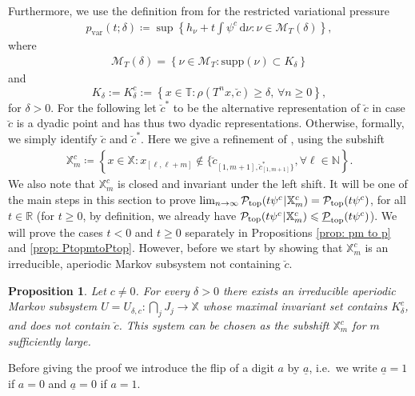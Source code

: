 \documentclass[11pt,reqno]{amsart}
\theoremstyle{plain}
\newtheorem{prop}[theorem]{Proposition}
\theoremstyle{definition}
\newcommand{\X}{{\mathbb X}}
\newcommand{\cP}{\mathcal{P}}
\newcommand{\ts}{\hspace{0.5pt}}
\newcommand{\supp}{\mathrm{supp}}
\newcommand{\TT}{\mathbb{T}}
\begin{document}
Furthermore, we use the definition from \cite{fan_generalized_2020} for the restricted variational pressure 
\begin{align}
 p_{\operatorname{var}}(t; \delta) \coloneqq \sup \left\{h_{\nu} + t\int \psi^c\,\mathrm{d}\nu\colon \nu\in \mathcal{M}_{T}\left(\delta\right)\right\},\label{eq: rest var press}
\end{align}
where 
\begin{align*}
 \mathcal{M}_T\left(\delta\right) = \left\{\nu \in \mathcal{M}_T\colon \supp(\nu) \subset K_{\delta}\right\}
\end{align*}
and 
\begin{equation}
 K_\delta := K^c_\delta := \left\{ x \in \TT: \rho(T^n x, \breve{c} ) \geqslant \delta, \, \forall n \geqslant 0 \right\},\label{eq: def Kdelta}
 \end{equation}
 for $\delta>0$. 
For the following let $\breve{c}^{\ast}$ to be the alternative representation of $\breve{c}$ in case $\breve{c}$ is a dyadic point and has thus two dyadic representations. Otherwise, formally, we simply identify $\breve{c}$ and $\breve{c}^{\ast}$. 
Here we give a refinement of \cite[Prop.~6.2]{fan_generalized_2020}, using
the subshift
 \begin{align*}
  \mathbb{X}_m^c\coloneqq \left\{x \in\mathbb{X}\colon x_{[\ell,\ell+m]} \notin \{ \breve{c}_{[1,m+1],\breve{c}_{[1,m+1]}^{\ast}\}},\forall\ell \in\mathbb{N}\right\}.%
 \end{align*}
We also note that $\mathbb{X}_m^c$ is closed and invariant under the left shift.
It will be one of the main steps in this section to prove $\lim_{n\to\infty}\cP_{\operatorname{top}}(t \psi^c \ts | \ts \X_m^c) = \cP_{\operatorname{top}}(t \psi^c)$, for all $t\in \mathbb{R}$ (for $t\geqslant 0$, by definition, we already have 
$\cP_{\operatorname{top}}(t \psi^c \ts | \ts \X_m^c) \leqslant \underline{\cP}_{\operatorname{top}}(t \psi^c)$). 
We will prove the cases $t<0$ and $t\geqslant 0$ separately in Propositions \ref{prop: pm to p} and \ref{prop: PtopmtoPtop}. However, before we start by showing that $\X_m^c$ is an irreducible, aperiodic Markov subsystem not containing $\breve{c}$. 




\begin{prop}\label{prop: Xm Kdelta}
 Let $c\neq 0$. For every $\delta > 0$ there exists an irreducible aperiodic Markov subsystem $U = U_{\delta, c}\colon \bigcap_{j} J_j \to \mathbb{X}$ whose maximal invariant set contains $K_{\delta}^{c}$, and does not contain $\breve{c}$.
 This system can be chosen as the subshift $\mathbb{X}_m^{c}$ for $m$ sufficiently large. 
\end{prop}
Before giving the proof we introduce the flip of a digit $a$ by $\underline{a}$, i.e.\ we write $\underline{a}=1$ if $a=0$ and $\underline{a}=0$ if $a=1$.
\end{document}
